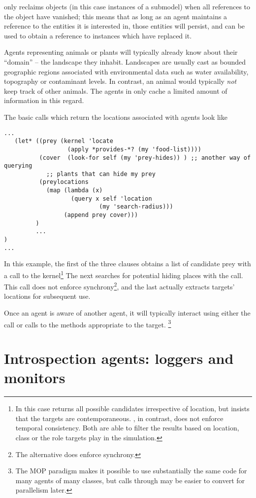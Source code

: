 \Scheme only reclaims objects (in this case instances of a submodel)
when all references to the object have vanished; this means that as
long as an agent maintains a reference to the entities it is
interested in, those entities will persist, and can be used to obtain
a reference to instances which have replaced it.

Agents representing animals or plants will typically already know
about their ``domain'' -- the landscape they inhabit.  Landscapes are
usually cast as bounded geographic regions associated with
environmental data such as water availability, topography or
contaminant levels. In contrast, an animal would typically \emph{not}
keep track of other animals.  The agents in \ReModel only
cache a limited amount of information in this regard.

The basic calls which return the locations associated with agents look
like
\begin{verbatim}
...
   (let* ((prey (kernel 'locate 
                  (apply *provides-*? (my 'food-list))))
          (cover  (look-for self (my 'prey-hides)) ) ;; another way of querying
            ;; plants that can hide my prey
          (preylocations 
            (map (lambda (x) 
                   (query x self 'location 
                           (my 'search-radius))) 
                 (append prey cover)))
         )
         ...
)
...
\end{verbatim}
In this example, the first of the three clauses obtains a list of
candidate prey with a call to the kernel\footnote{In this case
   returns all possible candidates irrespective of
  location, but insists that the targets are
  contemporaneous. , in contrast, does not enforce
  temporal consistency. Both are able to filter the results based on
  location, class or the role targets play in the simulation.}  The
next searches for potential hiding places with the 
call. This call does not enforce synchrony\footnote{The alternative
   does enforce synchrony.}, and the last actually
extracts targets' locations for subsequent use.

Once an agent is aware of another agent, it will typically interact
using either the  call or calls to the methods
appropriate to the target. \footnote{The MOP paradigm makes it possible to use
substantially the same code for many agents of many classes, but calls
through  may be easier to convert for parallelism later.}


\section{Introspection agents: loggers and monitors}

